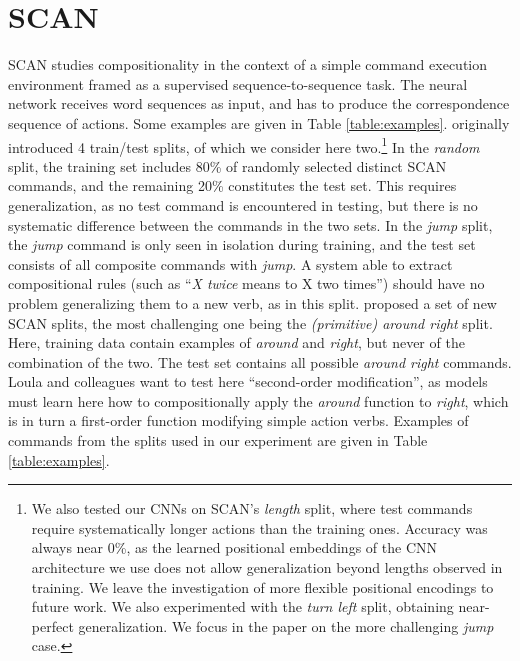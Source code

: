 \section{SCAN}
\label{sec:setup}

SCAN studies compositionality in the context of a simple command
execution environment framed as a supervised sequence-to-sequence
task. The neural network receives word sequences as input, and has to
produce the correspondence sequence of actions. Some examples are
given in Table \ref{table:examples}.
   originally introduced 4
train/test splits, of which we consider here two.\footnote{We also
  tested our CNNs on SCAN's \emph{length} split, where test commands
  require systematically longer actions than the training
  ones. Accuracy was always near 0\%, as the learned positional
  embeddings of the CNN architecture we use does not allow
  generalization beyond lengths observed in training. We leave the
  investigation of more flexible positional encodings \cite[as in,
  e.g.,][]{vaswani:etal:2017} to future work. We also experimented
  with the \emph{turn left} split, obtaining near-perfect
  generalization. We focus in the paper on the more challenging
  \emph{jump} case.} In the \emph{random} split, the training set
includes 80\% of randomly selected distinct SCAN commands, and the
remaining 20\% constitutes the test set. This requires generalization,
as no test command is encountered in testing, but there is no
systematic difference between the commands in the two sets.  In the
\emph{jump} split, the \emph{jump} command is only seen in isolation
during training, and the test set consists of all composite commands
with \emph{jump}. A system able to extract compositional rules (such
as ``\emph{X twice} means to X two times'') should have no problem
generalizing them to a new verb, as in this
split.  proposed a set of new SCAN splits,
the most challenging one being the \emph{(primitive) around right}
split.  Here, training data contain examples of \emph{around} and
\emph{right}, but never of the combination of the two. The test set
contains all possible \emph{around right} commands. Loula and
colleagues want to test here ``second-order modification'', as models
must learn here how to compositionally apply the \emph{around}
function to \emph{right}, which is in turn a first-order function
modifying simple action verbs. Examples of commands from the splits
used in our experiment are given in Table \ref{table:examples}.


